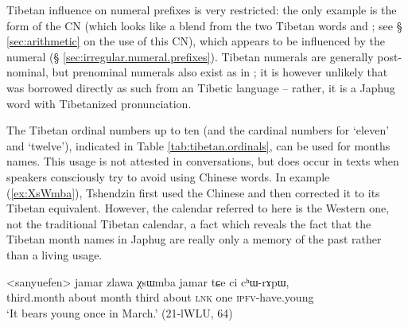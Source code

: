 Tibetan influence on numeral prefixes is very restricted: the only example is the form  of the CN  (which looks like a blend from the two Tibetan words  and ; see § \ref{sec:arithmetic} on the use of this CN), which appears to be influenced by the numeral   (§ \ref{sec:irregular.numeral.prefixes}). Tibetan numerals are generally post-nominal, but prenominal numerals also exist as in ; it is however unlikely that  was borrowed directly as such from an Tibetic language -- rather, it is a Japhug word with Tibetanized pronunciation.

The Tibetan ordinal numbers up to ten (and the cardinal numbers for `eleven' and `twelve'), indicated in Table \ref{tab:tibetan.ordinals}, can be used for months names. This usage is not attested in conversations, but does occur in texts when  speakers consciously try to avoid using Chinese words. In example (\ref{ex:XsWmba}), Tshendzin first used the Chinese  and then corrected it to its Tibetan equivalent. However, the calendar referred to here is the Western one, not the traditional Tibetan calendar, a fact which reveals the fact that the Tibetan month names in Japhug are really only a memory of the past rather than a living usage.

\begin{exe}
\ex \label{ex:XsWmba}
\gll <sanyuefen> jamar zlawa χsɯmba jamar tɕe ci cʰɯ-rɤpɯ, \\
 third.month about month third about \textsc{lnk} one \textsc{ipfv}-have.young  \\
\glt `It bears young once in March.' (21-lWLU, 64)
\end{exe}

